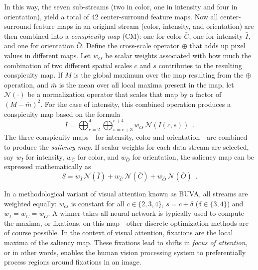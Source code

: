\documentclass {udthesis}
\begin{document}
In this way, the seven sub-streams (two in color, one in intensity and four in orientation), 
yield a total of 42 center-surround feature maps.
Now all center-surround feature maps in an original stream (color, intensity,
and orientation) are then combined into a \emph{conspicuity map} (CM):
one for color $\bar{C}$, one for intensity $\bar{I}$, and one for orientation $\bar{O}$. 
Define the cross-scale operator $\oplus$ that adds up pixel values in different maps. 
Let $w_{cs}$ be scalar weights associated with how much the combination of
two different spatial scales $c$ and $s$ contributes to the resulting conspicuity map.
If $M$ is the global maximum over the map resulting from the $\oplus$ operation, and $\bar{m}$ is the mean over
all local maxima present in the map, let $\mathcal{N}(\cdot)$ be a normalization operator that scales that map by a factor of $(M-\bar{m})^{2}$.
For the case of intensity, this combined operation produces a conspicuity map based on the formula
%
\begin{equation} \label{eq:feature_map}
 \bar{I}=\bigoplus_{c=2}^{4} \bigoplus_{s=c+3}^{c+4}w_{cs}\,\mathcal{N}(I(c,s))
\enspace.
\end{equation}
%
The three conspicuity maps---for intensity, color and orientation---are combined to produce the \emph{saliency map}.
If scalar weights for each data stream are selected, say
$w_{\bar{I}}$ for intensity, $w_{\bar{C}}$ for color, and 
$w_{\bar{O}}$ for orientation, the saliency map can be expressed mathematically as
%
\begin{equation} \label{eq:saliency_map}
 S=w_{\bar{I}}\,\mathcal{N}(\bar{I})+w_{\bar{C}}\,\mathcal{N}(\bar{C})+
 w_{\bar{O}}\,\mathcal{N}(\bar{O}) \enspace.
\end{equation}
%

In a methodological variant of visual attention known as BUVA, all streams are weighted equally: $w_{cs}$ is constant for all $c\in\{2,3,4\}$,  $s=c+\delta$ ($\delta\in\{3,4\}$)
and $w_{\bar{I}}=w_{\bar{C}}=w_{\bar{O}}$. 
A winner-takes-all neural network is typically used \cite{itti,walther} 
to compute the maxima, or fixations, on this map---other discrete optimization methods are of course possible.
In the context of visual attention, fixations are the local maxima of the saliency map.  
These fixations lead to shifts in \emph{focus of attention}, or in other words, 
enables the human vision processing system to preferentially process regions 
around fixations in an image.
\end{document}
